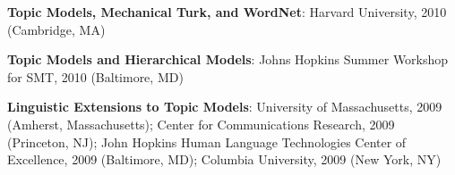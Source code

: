 {{\begin{enumerate*}
	\item {\bf Topic Models, Mechanical Turk, and WordNet}: Harvard University, 2010 (Cambridge, MA)
	\item {\bf Topic Models and Hierarchical Models}: Johns Hopkins Summer Workshop for SMT, 2010 (Baltimore, MD)
	\item {\bf Linguistic Extensions to Topic Models}: University of
          Massachusetts, 2009 (Amherst, Massachusetts); Center for
          Communications Research, 2009 (Princeton, NJ); John Hopkins Human
          Language Technologies Center of Excellence, 2009 (Baltimore, MD); Columbia University, 2009 (New York, NY)
\end{enumerate*}


}
}



\ifumd
\else
{}
\fi





\ifumd
\talks{}
\fi

\clearpage


